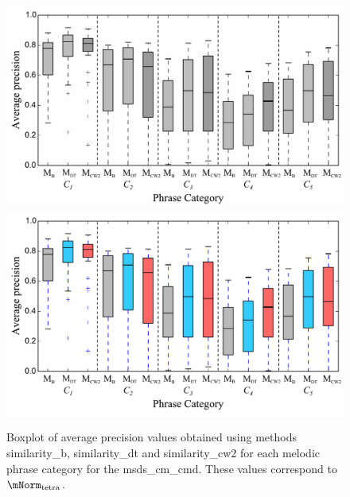 \begin{figure}
	\begin{center}
		\ifdefined\PRINTVER
			\includegraphics[width=\figSizeHundred]{ch06_patterns/figures/ImprovingSimilarity/CarnaticPerCategoryPerformance_BOXPLOT_BW.pdf}
		\else
			\includegraphics[width=\figSizeHundred]{ch06_patterns/figures/ImprovingSimilarity/CarnaticPerCategoryPerformance_BOXPLOT.pdf}
		\fi
	\end{center}
	\caption[Boxplot of average precision for different types of melodic patterns in the Carnatic music dataset]{Boxplot of average precision values obtained using methods \acrshort{similarity_b}, \acrshort{similarity_dt} and \acrshort{similarity_cw2} for each melodic phrase category for the \acrshort{msds_cm_cmd}. These values correspond to $\mNorm_\mathrm{tetra}$.}
	\label{fig:carnaticPerCategoryPerformance}
\end{figure}


